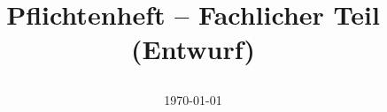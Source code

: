 \title{%
    \vspace{60mm}
    \Huge{Pflichtenheft -- Fachlicher Teil} \\
    \huge{(Entwurf)}
    \date{\today}
}
